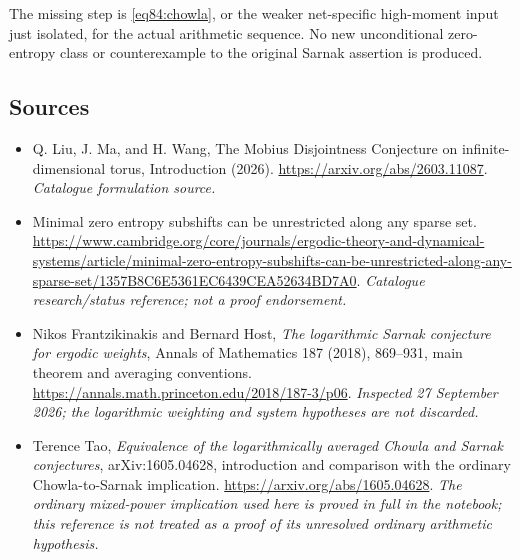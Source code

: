 \documentclass[11pt,a4paper]{article}
\numberwithin{equation}{section}
\begin{document}
The missing step is \eqref{eq84:chowla}, or the weaker net-specific
high-moment input just isolated, for the actual arithmetic sequence.
No new unconditional zero-entropy class or counterexample to the original
Sarnak assertion is produced.

\needspace{170mm}
\subsection{Sources}
\begin{itemize}\raggedright
\item[\textnormal{[S1]}]\hypertarget{source:30002209:1}{} Q. Liu, J. Ma, and H. Wang, The Mobius Disjointness Conjecture on infinite-dimensional torus, Introduction (2026).
\url{https://arxiv.org/abs/2603.11087}.
{\small\textit{Catalogue formulation source.}}
\item[\textnormal{[S2]}]\hypertarget{source:30002209:2}{} Minimal zero entropy subshifts can be unrestricted along any sparse set.
\url{https://www.cambridge.org/core/journals/ergodic-theory-and-dynamical-systems/article/minimal-zero-entropy-subshifts-can-be-unrestricted-along-any-sparse-set/1357B8C6E5361EC6439CEA52634BD7A0}.
{\small\textit{Catalogue research/status reference; not a proof endorsement.}}
\item[\textnormal{[E1]}]\hypertarget{extra:30002209:1}{} Nikos Frantzikinakis
and Bernard Host, \emph{The logarithmic Sarnak conjecture for ergodic weights},
Annals of Mathematics 187 (2018), 869--931, main theorem and averaging
conventions.
\url{https://annals.math.princeton.edu/2018/187-3/p06}.
{\small\textit{Inspected 27 September 2026; the logarithmic weighting and
system hypotheses are not discarded.}}
\item[\textnormal{[E2]}]\hypertarget{extra:30002209:2}{} Terence Tao,
\emph{Equivalence of the logarithmically averaged Chowla and Sarnak
conjectures}, arXiv:1605.04628, introduction and comparison with the
ordinary Chowla-to-Sarnak implication.
\url{https://arxiv.org/abs/1605.04628}.
{\small\textit{The ordinary mixed-power implication used here is proved
in full in the notebook; this reference is not treated as a proof of its
unresolved ordinary arithmetic hypothesis.}}
\end{itemize}
\end{document}
